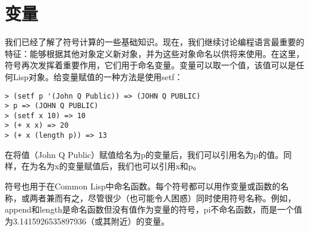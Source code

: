 \section{变量}
我们已经了解了符号计算的一些基础知识。现在，我们继续讨论编程语言最重要的特征：能够根据其他对象定义新对象，并为这些对象命名以供将来使用。在这里，符号再次发挥着重要作用，它们用于命名变量。变量可以取一个值，该值可以是任何Lisp对象。给变量赋值的一种方法是使用setf：
\begin{lstlisting}[frame=shadowbox]
> (setf p '(John Q Public)) => (JOHN Q PUBLIC)
> p => (JOHN Q PUBLIC)
> (setf x 10) => 10
> (+ x x) => 20
> (+ x (length p)) => 13
\end{lstlisting}
在将值（John Q Public）赋值给名为p的变量后，我们可以引用名为p的值。同样，在为名为x的变量赋值后，我们也可以引用x和p。

符号也用于在Common Lisp中命名函数。每个符号都可以用作变量或函数的名称，或两者兼而有之，尽管很少（也可能令人困惑）同时使用符号名称。例如，append和length是命名函数但没有值作为变量的符号，pi不命名函数，而是一个值为3.1415926535897936（或其附近）的变量。

